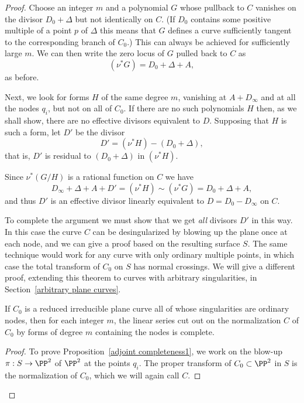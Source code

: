 \begin{proof}
 Choose an integer $m$ and a polynomial $G$ whose pullback to $C$
  vanishes on the divisor $D_0+\Delta$ 
 but not identically on $C$. (If $D_0$ contains some positive multiple of a point $p$ of $\Delta$ this means that $G$ defines
 a curve sufficiently tangent to the corresponding branch of $C_0$.) This can always be achieved for
 sufficiently large $m$. We can then write the zero locus of $G$ pulled back to $C$ as
$$
(\nu^*G) = D_0 + \Delta + A,
$$
as before. 


Next, we look for forms $H$ of the same degree $m$, vanishing at $A+D_\infty$ and at all the nodes $q_i$,  but not on all of $C_0$. If there are no such polynomials $H$ then, as we shall show,
there are no effective divisors equivalent to $D$. Supposing that $H$ is such a form, let $D'$ be the divisor 
$$
D' = (\nu^*H) -( D_0 + \Delta),
$$
that is, $D'$ is residual to $( D_0 + \Delta)$ in $(\nu^*H)$. 

Since $\nu^*(G/H)$ is a rational function on $C$ we have
$$
D_\infty +\Delta + A+ D' = (\nu^*H) \sim (\nu^*G) = D_0 + \Delta + A,
$$
and thus $D'$ is an effective divisor linearly equivalent to $D = D_{0}-D_{\infty}$ on $C$.

To complete the argument we must show that we get \emph{all} divisors $D'$ in this way.
In this case the curve $C$ can be desingularized by blowing up the plane once at each node,
and we can give a proof based on the resulting surface $S$. The same technique would work for any curve with only
ordinary multiple points, in which case the total transform of $C_{0}$ on $S$ has normal crossings. We will give a different proof, extending this theorem to curves with arbitrary singularities, in Section~\ref{arbitrary plane curves}.

\begin{proposition}\label{adjoint completeness1}
If $C_{0}$ is a reduced irreducible plane curve all of whose singularities are ordinary nodes, then for each
integer $m$,
the linear series cut out on the normalization $C$ of $C_{0}$ by forms of degree $m$ containing the nodes
is complete.
\end{proposition}

\begin{proof}
To prove Proposition~\ref{adjoint completeness1}, we work on the blow-up $\pi : S \to \PP^2$ of $\PP^2$ at the points $q_i$. The proper transform of $C_0 \subset \PP^2$ in $S$ is the normalization of $C_0$, which we will again call $C$.


\end{proof}
\end{proof}
